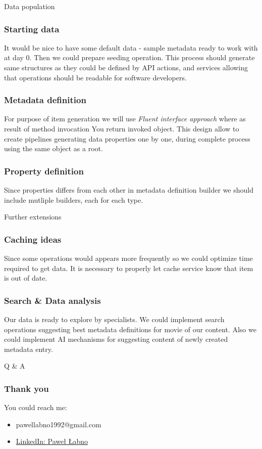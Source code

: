 \documentclass{beamer}
\begin{document}
\begin{section}{Data population}
\begin{frame}
\frametitle{Starting data}
It would be nice to have some default data - sample metadata ready to work with at day 0. Then we could prepare seeding operation. This process should generate same structures as they could be defined by API actions, and services allowing that operations should be readable for software developers.
\end{frame}

\begin{frame}
\frametitle{Metadata definition}
For purpose of item generation we will use \textit{Fluent interface approach} where as result of method invocation You return invoked object. This design allow to create pipelines generating data properties one by one, during complete process using the same object as a root.
\end{frame}

\begin{frame}
\frametitle{Property definition}
Since properties differs from each other in metadata definition builder we should include mutliple builders, each for each type. 
\end{frame}
\end{section}

\begin{section}{Further extensions}

\begin{frame}
\frametitle{Caching ideas}
Since some operations would appears more frequently so we could optimize time required to get data. It is necessary to properly let cache service know that item is out of date.
\end{frame}

\begin{frame}
\frametitle{Search \& Data analysis}
Our data is ready to explore by specialists. We could implement search operations suggesting best metadata definitions for movie of our content. Also we could implement AI mechanisms for suggesting content of newly created metadata entry.
\end{frame}

\end{section}



\begin{section}{Q \& A}

\begin{frame}
\frametitle{Thank you}
You could reach me: \\

 \begin{itemize}
	  \item pawellabno1992@gmail.com
	  \item \href{https://www.linkedin.com/in/paweł-łabno-72160b68}{LinkedIn: Paweł Łabno}
\end{itemize}

\end{frame}


\end{section}
\end{document}
